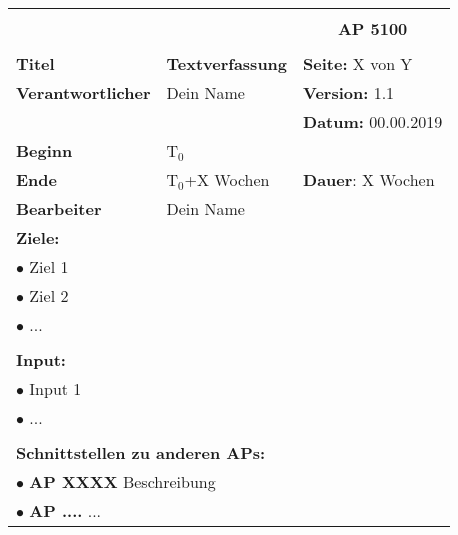 \begin{table}[!h]
 \begin{center}
  \begin{tabular}{|p{35mm}||p{55mm}|p{50mm}||p{40mm}|}
   \hline
   \multicolumn{3}{|l||}{\textbf{}} & \multicolumn{1}{c|}{}\\
   \multicolumn{3}{|l||}{\textbf{}} & \multicolumn{1}{c|}{\textbf{AP 5100}}\\
   \multicolumn{3}{|l||}{\textbf{}} & \multicolumn{1}{c|}{}\\
   \hline\hline
   \textbf{Titel} & \multicolumn{2}{p{7cm}||}{\textbf{Textverfassung}} & \textbf{Seite:} X von Y\\
   \hline
   \textbf{Verantwortlicher} & \multicolumn{2}{l||}{Dein Name} & \textbf{Version:} 1.1\\
   \hline
   \multicolumn{3}{|l||}{} & \textbf{Datum:} 00.00.2019\\
   \hline\hline
   \textbf{Beginn} & \multicolumn{2}{l||}{T$_0$} & \\
   \hline
   \textbf{Ende} & \multicolumn{2}{l||}{T$_0$+X Wochen} & \textbf{Dauer}: X Wochen\\
   \hline\hline
   \textbf{Bearbeiter} & \multicolumn{3}{l|}{Dein Name}\\
   \hline\hline
   \multicolumn{4}{|p{150mm}|}{\textbf{Ziele:}}\\
   \multicolumn{4}{|p{150mm}|}{$\bullet$ Ziel 1}\\
   \multicolumn{4}{|p{150mm}|}{$\bullet$ Ziel 2}\\
   \multicolumn{4}{|p{150mm}|}{$\bullet$ ...}\\
   \multicolumn{4}{|p{150mm}|}{}\\
   \multicolumn{4}{|p{150mm}|}{\textbf{Input:}}\\
   \multicolumn{4}{|p{150mm}|}{$\bullet$ Input 1}\\
   \multicolumn{4}{|p{150mm}|}{$\bullet$ ...}\\
   \multicolumn{4}{|p{150mm}|}{}\\
   \multicolumn{4}{|p{150mm}|}{\textbf{Schnittstellen zu anderen APs:}}\\
   \multicolumn{4}{|p{150mm}|}{$\bullet$ \textbf{AP XXXX} Beschreibung}\\
   \multicolumn{4}{|p{150mm}|}{$\bullet$ \textbf{AP ....} ...}\\

\end{tabular}
\end{center}
\end{table}
